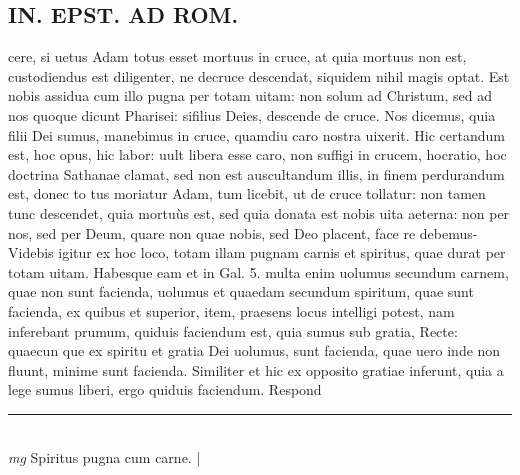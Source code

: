 \documentclass{article}
\begin{document}
\begin{pages}
\section*{IN. EPST. AD ROM.  }
\marginpar{[ p.69 ]}\pstart cere, si uetus Adam totus esset mortuus in cruce, at quia mortuus non est, custodiendus est diligenter, ne decruce descendat, siquidem nihil magis optat. Est nobis assidua cum illo pugna per totam uitam: non solum ad Christum, sed ad nos quoque dicunt Pharisei: sifilius Deies, descende de cruce. Nos dicemus, quia filii Dei sumus, manebimus in cruce, quamdiu caro nostra uixerit. Hic certandum est, hoc opus, hic labor: uult libera esse caro, non suffigi in crucem, hocratio, hoc doctrina Sathanae clamat, sed non est auscultandum illis, in finem perdurandum est, donec to tus moriatur Adam, tum licebit, ut de cruce tollatur: non tamen tunc descendet, quia mortuùs est, sed quia donata est nobis uita aeterna: non per nos, sed per Deum, quare non quae nobis, sed Deo placent, face re debemus-Videbis igitur ex hoc loco, totam illam pugnam carnis et spiritus, quae durat per totam uitam. Habesque eam et in Gal. 5. multa enim uolumus secundum carnem, quae non sunt facienda, uolumus et quaedam secundum spiritum, quae sunt facienda, ex quibus et superior, item, praesens locus intelligi potest, nam inferebant prumum, quiduis faciendum est, quia sumus sub gratia, Recte: quaecun que ex spiritu et gratia Dei uolumus, sunt facienda, quae uero inde non fluunt, minime sunt facienda.  Similiter et hic ex opposito gratiae inferunt, quia a lege sumus liberi, ergo quiduis faciendum. Respond  \pend
\vspace{0.5cm}\noindent
\vspace{0.2cm}\rule{1cm}{0.2pt}\\ 
\hspace{0.2cm}\textit{mg}
\footnotesize Spiritus pugna cum carne.  
\normalsize| 

\end{pages}
\end{document}
